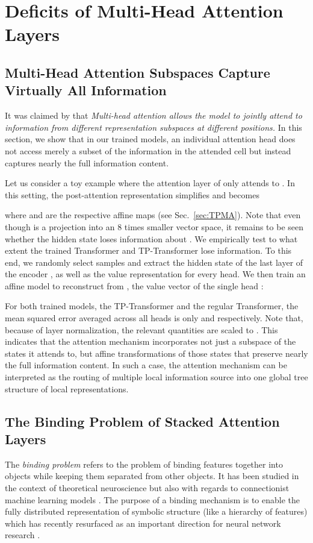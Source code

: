 \documentclass[11pt,a4paper]{article}
\newcommand{\ischl}[1]{{#1}}
\begin{document}
\section{\ischl{Deficits of Multi-Head Attention Layers}}
\subsection{Multi-Head Attention Subspaces Capture Virtually All Information}
\label{sec:information}
It was claimed by \cite{vaswani2017attention} that \textit{Multi-head attention allows the model to jointly attend to information from different representation subspaces at different positions.} In this section, we show that in our trained models, an individual attention head does not access merely a subset of the information in the attended cell but instead captures nearly the full information content.

Let us consider a toy example where the attention layer of  only attends to . In this setting, the post-attention representation simplifies and becomes 

where  and  are the respective affine maps (see Sec.~\ref{sec:TPMA}).
Note that even though  is a projection into an 8 times smaller vector space, it remains 
to be seen whether the hidden state loses information about .
We empirically test to what extent the trained Transformer and TP-Transformer lose information. 
To this end, we randomly select  samples and extract the hidden state of the last layer of the encoder , as well as the value representation  for every head. 
We then train an affine model to reconstruct  from , the value vector of the single head :

For both trained models, the TP-Transformer and the regular Transformer, the mean squared error  averaged across all heads is only  and  respectively.
Note that, because of layer normalization, the relevant quantities are scaled to .
This indicates that the attention mechanism incorporates not just a subspace of the states it attends to, but affine transformations of those states that preserve nearly the full information content. 
\ischl{In such a case, the attention mechanism can be interpreted as the routing of multiple local information source into one global tree structure of local representations. }

\subsection{The Binding Problem of Stacked Attention Layers} \label{sec:Binding}
The \textit{binding problem} refers to the problem of binding features together into objects while keeping them separated from other objects.
It has been studied in the context of theoretical neuroscience \citep{von1981correlation, von1994correlation} but also with regards to connectionist machine learning models \citep{hinton1984distributed}. 
The purpose of a binding mechanism is to enable the fully distributed representation of symbolic structure (like a hierarchy of features) which has recently resurfaced as an important direction for neural network research \citep{lake2017generalization, bahdanau2018systematic, van2019perspective, palangi2017deep, tang2018learning}. 
\end{document}
